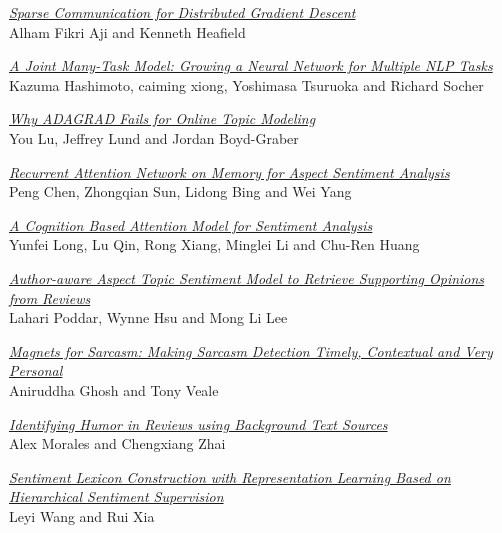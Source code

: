 \hyperlink{page.438}{\em Sparse Communication for Distributed Gradient Descent}\samepage \\
\hspace*{7mm} Alham Fikri Aji and Kenneth Heafield\dotfill {}

\hyperlink{page.444}{\em A Joint Many-Task Model: Growing a Neural Network for Multiple NLP Tasks}\samepage \\
\hspace*{7mm} Kazuma Hashimoto, caiming xiong, Yoshimasa Tsuruoka and Richard Socher\dotfill {}

\hyperlink{page.455}{\em Why ADAGRAD Fails for Online Topic Modeling}\samepage \\
\hspace*{7mm} You Lu, Jeffrey Lund and Jordan Boyd-Graber\dotfill {}

\hyperlink{page.461}{\em Recurrent Attention Network on Memory for Aspect Sentiment Analysis}\samepage \\
\hspace*{7mm} Peng Chen, Zhongqian Sun, Lidong Bing and Wei Yang\dotfill {}

\hyperlink{page.471}{\em A Cognition Based Attention Model for Sentiment Analysis}\samepage \\
\hspace*{7mm} Yunfei Long, Lu Qin, Rong Xiang, Minglei Li and Chu-Ren Huang\dotfill {}

\hyperlink{page.481}{\em Author-aware Aspect Topic Sentiment Model to Retrieve Supporting Opinions from Reviews}\samepage \\
\hspace*{7mm} Lahari Poddar, Wynne Hsu and Mong Li Lee\dotfill {}

\hyperlink{page.491}{\em Magnets for Sarcasm: Making Sarcasm Detection Timely, Contextual and Very Personal}\samepage \\
\hspace*{7mm} Aniruddha Ghosh and Tony Veale\dotfill {}

\hyperlink{page.501}{\em Identifying Humor in Reviews using Background Text Sources}\samepage \\
\hspace*{7mm} Alex Morales and Chengxiang Zhai\dotfill {}

\hyperlink{page.511}{\em Sentiment Lexicon Construction with Representation Learning Based on Hierarchical Sentiment Supervision}\samepage \\
\hspace*{7mm} Leyi Wang and Rui Xia\dotfill {}

